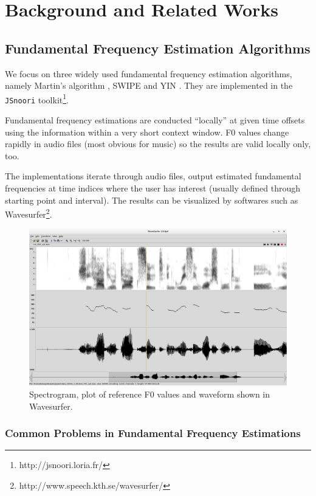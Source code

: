 \documentclass[11pt,a4paper,titlepage]{article}
\begin{document}
\section{Background and Related Works}

\subsection{Fundamental Frequency Estimation Algorithms}
We focus on three widely used fundamental frequency estimation algorithms, namely Martin's algorithm \cite{martin1982comparison}, SWIPE \cite{camacho2007swipe} and YIN \cite{de2002yin}.
They are implemented in the \texttt{JSnoori} toolkit\footnote{http://jsnoori.loria.fr/}.

Fundamental frequency estimations are conducted \enquote{locally} at given time offsets using the information within a very short context window.
F0 values change rapidly in audio files (most obvious for music) so the results are valid locally only, too.

The implementations iterate through audio files, output estimated fundamental frequencies at time indices where the user has interest (usually defined through starting point and interval).
The results can be visualized by softwares such as Wavesurfer\footnote{http://www.speech.kth.se/wavesurfer/}\cite{sjolander2000wavesurfer}.

\begin{figure}[htbp]
  \centering
  \includegraphics[width=\textwidth]{wavesurfer.png}
  \caption{Spectrogram, plot of reference F0 values and waveform shown in Wavesurfer.} \label{fig:wavesurfer}
\end{figure}

\subsubsection{Common Problems in Fundamental Frequency Estimations}
\end{document}
